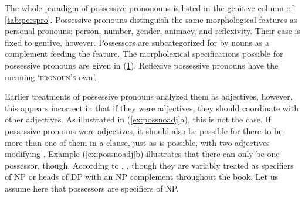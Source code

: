 The whole paradigm of possessive prononouns is listed in the genitive column of
\autoref{tab:perspro}. Possessive pronouns distinguish the same morphological
features as personal pronouns: person, number, gender, animacy, and
reflexivity. Their case is fixed to gentive, however. Possessors are
subcategorized for by nouns as a complement feeding the \Poss{} feature. The
morpholexical specifications possible for possessive pronouns are given in
(\ref{ex:posspromorphlex}). Reflexive possessive pronouns have the meaning
`\textsc{pronoun's} own'.

\begin{figure}[h]
\begin{morphlex}
\ex\label{ex:posspromorphlex}
\xe
\end{morphlex}
\end{figure}

Earlier treatments of possessive pronouns analyzed them as adjectives, however,
this appears incorrect in that if they were adjectives, they should coordinate
with other adjectives. As illustrated in (\ref{ex:possnoadj}a), this is not the
case. If possessive pronouns were adjectives, it should also be possible for
there to be more than one of them in a clause, just as  is
possible, with two adjectives modifying . Example (\ref{ex:possnoadj}b)
illustrates that there can only be one possessor, though. According to
\citet{bresnan2016}, , though they are variably treated as specifiers
of NP or heads of DP with an NP complement throughout the book. Let us assume
here that possessors are specifiers of NP.

